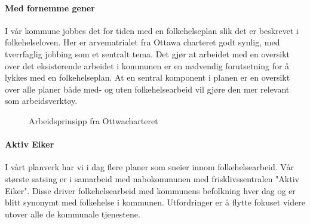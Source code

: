 \documentclass[12pt]{memoir} %
\begin{document}
		\paragraph{Med fornemme gener\\}
			I vår kommune jobbes det for tiden med en folkehelseplan slik det er beskrevet i folkehelseloven\cite{Folkehelseloven}. Her er arvematrialet fra Ottawa charteret\cite{ottawa} godt synlig, med tverrfaglig jobbing som et sentralt tema. Det gjør at arbeidet med en oversikt over det eksisterende arbeidet i kommunen er en nødvendig forutsetning for å lykkes med en folkehelseplan\cite{andsmi}. At en sentral komponent i planen er en oversikt over alle planer både med- og uten folkehelsearbeid vil gjøre den mer relevant som arbeidsverktøy.

			  \begin{figure}[h]
                      \centering
                      \captionsetup{singlelinecheck=off}
                      \caption{Arbeidsprinsipp fra Ottwacharteret}
                    \end{figure}   
        \paragraph{Aktiv Eiker\\}
        	I vårt planverk har vi i dag flere planer som sneier innom folkehelsearbeid. Vår største satsing er i samarbeid med nabokommunen med frisklivssentralen "Aktiv Eiker". Disse driver folkehelsearbeid med kommunens befolkning hver dag og er blitt synonymt med folkehelse i kommunen. Utfordringer er å flytte fokuset videre utover alle de kommunale tjenestene.
\end{document}

